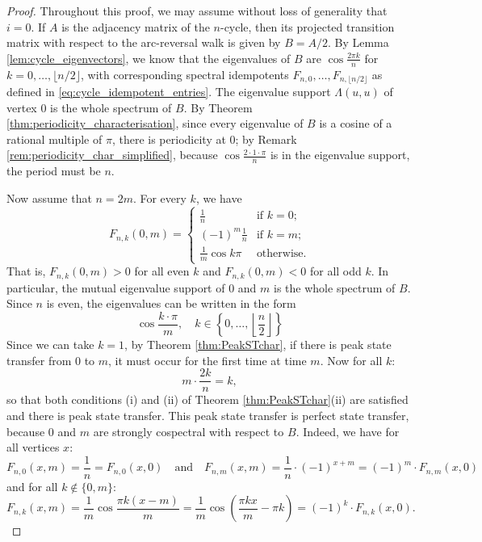 \documentclass{article}
\numberwithin{equation}{section}
\begin{document}
\begin{proof}
Throughout this proof, we may assume without loss of generality that $i=0$. If $A$ is the adjacency matrix of the $n$-cycle, then its projected transition matrix with respect to the arc-reversal walk is given by $B = A/2$. By Lemma \ref{lem:cycle_eigenvectors}, we know that the eigenvalues of $B$ are $\cos\frac{2\pi k}{n}$ for $k=0,\ldots,\lfloor n/2\rfloor$, with corresponding spectral idempotents $F_{n,0},\ldots,F_{n,\lfloor n/2\rfloor}$ as defined in \eqref{eq:cycle_idempotent_entries}. The eigenvalue support $\Lambda(u,u)$ of vertex $0$ is the whole spectrum of $B$. By Theorem \ref{thm:periodicity_characterisation}, since every eigenvalue of $B$ is a cosine of a rational multiple of $\pi$, there is periodicity at $0$; by Remark \ref{rem:periodicity_char_simplified}, because $\cos\frac{2\cdot 1 \cdot \pi}{n}$ is in the eigenvalue support, the period must be $n$.

Now assume that $n=2m$. For every $k$, we have
\[
F_{n,k}(0,m) = \begin{cases}
\frac{1}{n} &\text{if $k=0$};\\
(-1)^m\frac{1}{n} &\text{if $k=m$}; \\
\frac{1}{m}\cos k\pi &\text{otherwise.}
\end{cases}
\]
That is, $F_{n,k}(0,m) > 0$ for all even $k$ and $F_{n,k}(0,m) < 0$ for all odd $k$. In particular, the mutual eigenvalue support of $0$ and $m$ is the whole spectrum of $B$. Since $n$ is even, the eigenvalues can be written in the form
\[
\cos\frac{k\cdot\pi}{m}, \quad k\in\left\{0,\ldots,\left\lfloor \frac{n}{2}\right\rfloor\right\}
\]
Since we can take $k=1$, by Theorem \ref{thm:PeakSTchar}, if there is peak state transfer from $0$ to $m$, it must occur for the first time at time $m$. Now for all $k$:
\[
m \cdot \frac{2k}{n} = k,
\]
so that both conditions (i) and (ii) of Theorem \ref{thm:PeakSTchar}(ii) are satisfied and there is peak state transfer. This peak state transfer is perfect state transfer, because $0$ and $m$ are strongly cospectral with respect to $B$. Indeed, we have for all vertices $x$:
\[
F_{n,0}(x,m) = \frac{1}{n} = F_{n,0}(x,0) \quad \text{and} \quad F_{n,m}(x,m) = \frac{1}{n}\cdot (-1)^{x+m} = (-1)^m \cdot F_{n,m}(x,0)
\]
and for all $k \notin \{0,m\}$:
\[
F_{n,k}(x,m) = \frac{1}{m} \cos\frac{\pi k (x - m)}{m} = \frac{1}{m} \cos\left(\frac{\pi k x}{m} - \pi k \right) = (-1)^k \cdot F_{n,k}(x,0).
\]



\end{proof}
\end{document}
